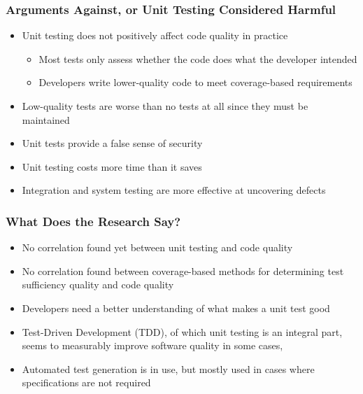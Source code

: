 \documentclass{beamer}
\begin{document}
\begin{frame}
\frametitle{Arguments Against, or Unit Testing Considered Harmful}
\begin{itemize}
	\item Unit testing does not positively affect code quality in practice
	\begin{itemize}
		\item Most tests only assess whether the code does what the developer intended
		\item Developers write lower-quality code to meet coverage-based requirements
	\end{itemize}
	\item Low-quality tests are worse than no tests at all since they must be maintained
	\item Unit tests provide a false sense of security
	\item Unit testing costs more time than it saves
	\item Integration and system testing are more effective at uncovering defects
\end{itemize}
\end{frame}

\begin{frame}
\frametitle{What Does the Research Say?}
\begin{itemize}
	\item No correlation found yet between unit testing and code quality\cite{codeQual}
	\item No correlation found between coverage-based methods for determining test sufficiency  quality and code quality\cite{codeQual}
	\item Developers need a better understanding of what makes a unit test good\cite{unitTestSurv}
	\item Test-Driven Development (TDD), of which unit testing is an integral part, seems to measurably improve software quality in some cases\cite{tddMeta},\cite{doesTDDWork}
	\item Automated test generation is in use, but mostly used in cases where specifications are not required\cite{unitTestSurv}
\end{itemize}
\end{frame}


\end{document}
